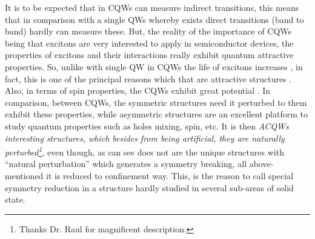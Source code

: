 It is to be expected that in \gls{CQWs} can measure indirect transitions, this means that in comparison with a single QWs whereby exists direct transitions (band to band) hardly can measure these. But, the reality of the importance of \gls{CQWs} being that excitons are very interested to apply in semiconductor devices, the properties of excitons and their interactions really exhibit quantum attractive properties. So, unlike with single \gls{QW} in \gls{CQWs} the life of excitons increases \cite{hammack2009kinetics,golub1990longlived}, in fact, this is one of the principal reasons which that are attractive structures \cite{butov1994condensation,sivalertporn2012direct,winbow2011electrostatic}. Also, in terms of spin properties, the \gls{CQWs} exhibit great potential \cite{bravo2022photoluminiscence}. In comparison, between CQWs, the symmetric structures need it perturbed to them exhibit these properties, while asymmetric structures are an excellent platform to study quantum properties such as holes mixing, spin, etc. It is then \emph{\gls{ACQWs} interesting structures, which besides from being artificial, they are naturally perturbed\footnote{Thanks Dr. Raul for magnificent description.}}, even though, as can see does not are the unique structures with ``natural perturbation'' which generates a symmetry breaking, all above-mentioned it is reduced to confinement way. This, is the reason to call special symmetry reduction in a structure hardly studied in several sub-areas of solid state.

